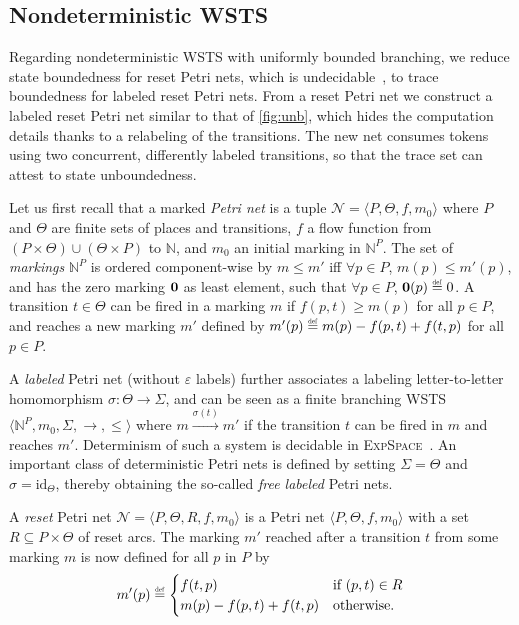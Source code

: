 \documentclass[11pt,reqno,a4paper]{amsart}
\newcommand{\eqdef}{\stackrel{\raisebox{-.15ex}{\scalebox{.5}{\upshape\textrm{def}}}}{=}}
\def\vec#1{\mathchoice{\mbox{\boldmath$\displaystyle#1$}}
{\mbox{\boldmath$\textstyle#1$}}
{\mbox{\boldmath$\scriptstyle#1$}}
{\mbox{\boldmath$\scriptscriptstyle#1$}}}
\newcommand{\tup}[1]{\langle #1\rangle}
\newcommand{\ru}[1]{\xrightarrow{#1}}
\theoremstyle{plain}
\theoremstyle{definition}
\theoremstyle{remark}
\begin{document}
\subsection{Nondeterministic WSTS}\label{sub:nondet}
Regarding nondeterministic WSTS with uniformly bounded branching, we reduce state
boundedness for reset Petri nets, which is
undecidable~\citep[Theorem 13]{lrpn}, to trace boundedness for labeled reset
Petri nets.  From a reset Petri net we construct a labeled reset Petri net
similar to that of \autoref{fig:unb}, which hides the computation details
thanks to a relabeling of the transitions.  The new net consumes
tokens using two concurrent, differently labeled transitions, so that
the trace set can attest to state unboundedness.

Let us first recall that a marked \emph{Petri net} is a tuple
$\mathcal{N}=\tup{P,\Theta,f,m_0}$ where $P$ and $\Theta$ are finite sets of
places and transitions, $f$ a flow function from $(P\times
\Theta)\cup(\Theta\times P)$ to $\mathbb{N}$, and $m_0$ an
initial marking in $\mathbb{N}^P$.  The set of \emph{markings}
$\mathbb{N}^P$ is ordered component-wise by $m\leq m'$ iff $\forall p\in
P$, $m(p)\leq m'(p)$, and has the zero marking $\vec{0}$ as least
element, such that $\forall p\in P$, $\vec{0}(p) \eqdef 0$.  A transition
$t\in \Theta$ can be fired in a marking $m$ if $f(p,t)\geq m(p)$ for all
$p\in P$, and reaches a new marking $m'$ defined by $m'(p) \eqdef m(p) -
f(p,t) + f(t,p)$ for all $p\in P$.

A \emph{labeled} Petri net (without $\varepsilon$ labels) further
associates a labeling letter-to-letter homomorphism $\sigma:
\Theta\rightarrow\Sigma$, and can be seen as a finite branching WSTS
$\tup{\mathbb{N}^P,m_0,\Sigma,{\rightarrow},{\leq}}$ where
$m\ru{\sigma(t)}m'$ if the transition $t$ can be fired in $m$ and
reaches $m'$.  Determinism of such a system is decidable in
\textsc{ExpSpace}~\citep{yen}.  An important class of deterministic
Petri nets is defined by setting $\Sigma=\Theta$ and
$\sigma=\text{id}_\Theta$, thereby obtaining the so-called \emph{free
  labeled} Petri nets.

A \emph{reset} Petri net $\mathcal{N}=\tup{P,\Theta,R,f,m_0}$ is
a Petri net $\tup{P,\Theta,f,m_0}$ with a set $R\subseteq
P\times\Theta$ of reset arcs.  The marking $m'$ reached after a
transition $t$ from some marking $m$ is now defined for all $p$ in $P$
by
\begin{equation*}
m'(p)\eqdef\begin{cases}f(t,p)&\text{if }(p,t)\in R\\m(p) - f(p,t) +
f(t,p)&\text{otherwise.}\end{cases}
\end{equation*}
\end{document}
